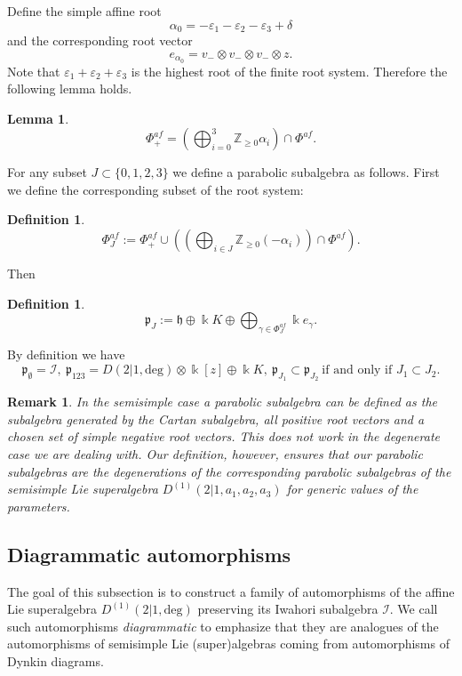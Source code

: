 \documentclass[10pt]{amsart}
\newtheorem{definition}[theorem]{Definition}
\newtheorem{lemma}[theorem]{Lemma}
\newtheorem{remark}[theorem]{Remark}
\newcommand{\fp}{{\mathfrak p}}
\newcommand{\fh}{{\mathfrak h}}
\newcommand{\Ddeg}{D(2|1,\mathrm{deg})}
\newcommand{\Daff}{D^{(1)}(2|1,\mathrm{deg})}
\begin{document}
	Define the simple affine root
	\[\alpha_0=-\varepsilon_1 - \varepsilon_2 -\varepsilon_3 + \delta\]
	and the corresponding root vector
	\[e_{\alpha_0}=v_-\otimes v_- \otimes v_- \otimes z.\]
	Note that $\varepsilon_1 + \varepsilon_2 +\varepsilon_3$ is the highest root of the finite root system. Therefore the following lemma holds.
	
	\begin{lemma}
		\[\Phi^{af}_+=\left(\bigoplus_{i=0}^3 \mathbb{Z}_{\geq 0}\alpha_i\right)\cap\Phi^{af}.\]
	\end{lemma}
	
	For any subset $J \subset \{0,1,2,3\}$ we define a parabolic subalgebra as follows. First we define the corresponding subset of the root system:
	
	\begin{definition}\label{def:parabolicRoots}
		\[\Phi^{af}_{J}:=\Phi^{af}_+\cup\left(\left(\bigoplus_{i\in J} \mathbb{Z}_{\geq 0}(-\alpha_i)\right)\cap\Phi^{af}\right).\]
	\end{definition}
	
	Then
	
	\begin{definition}\label{def:parabolicSubalgebras}
		\[\fp_J:=\fh \oplus \Bbbk K \oplus \bigoplus_{\gamma \in \Phi^{af}_{J}}\Bbbk e_{\gamma}.\]
	\end{definition}
	
	By definition we have 
	\begin{equation*}
		\fp_{\emptyset} =\mathcal{I},~\fp_{123}=\Ddeg \otimes \Bbbk[z] \oplus \Bbbk K,~ \fp_{J_1} \subset \fp_{J_2}~\text{if and only if } J_1 \subset J_2.
	\end{equation*}
	
	\begin{remark}\label{rem:ParabolicDegeneration}
		In the semisimple case a parabolic subalgebra can be defined as the subalgebra generated by the Cartan subalgebra, all positive root vectors and a chosen set of simple negative root vectors. This does not work in the degenerate case we are dealing with. Our definition, however, ensures that our parabolic subalgebras are the degenerations of the corresponding parabolic subalgebras of the semisimple Lie superalgebra $D^{(1)}(2|1,a_1,a_2,a_3)$ for generic values of the parameters.
	\end{remark}
	
	\subsection{Diagrammatic automorphisms}\label{ssec:DiagrammaticAutomorphisms}
	The goal of this subsection is to construct a family of automorphisms of the affine Lie superalgebra $\Daff$ preserving its Iwahori subalgebra $\mathcal{I}$. We call such automorphisms {\it diagrammatic} to emphasize that they are analogues of the automorphisms of semisimple Lie (super)algebras coming from automorphisms of Dynkin diagrams.
	
\end{document}
